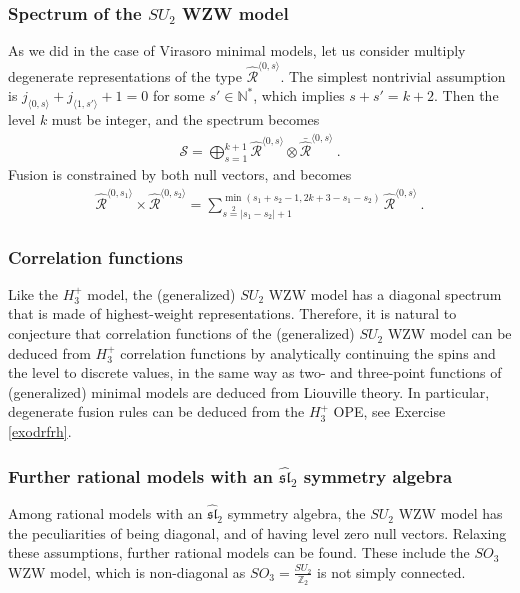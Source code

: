 \documentclass[12pt, a4paper, notitlepage, twoside]{report}
\numberwithin{equation}{section}
\theoremstyle{break}
\begin{document}
\subsubsection{Spectrum of the $SU_2$ WZW model}

As we did in the case of Virasoro minimal models, let us consider multiply degenerate representations of the type $\hat{\mathcal{R}}^{\langle 0, s\rangle}$. 
The simplest nontrivial assumption is $j_{\langle 0, s\rangle} + j_{\langle 1, s'\rangle} +1=0$ for some $s'\in\mathbb{N}^*$, which implies $s+s'=k+2$. 
Then the level $k$ must be integer, and the spectrum becomes 
\begin{align}
 \mathcal{S} = \bigoplus_{s=1}^{k+1} \hat{\mathcal{R}}^{\langle 0, s\rangle}\otimes \bar{\hat{\mathcal{R}}}^{\langle 0, s\rangle}\ .
\end{align}
Fusion is constrained by both null vectors, and becomes 
\begin{align}
 \hat{\mathcal{R}}^{\langle 0, s_1\rangle}\times\hat{\mathcal{R}}^{\langle 0, s_2\rangle} = \sum_{s\overset{2}{=}|s_1-s_2|+1}^{\min(s_1+s_2-1,2k+3-s_1-s_2)} \hat{\mathcal{R}}^{\langle 0, s\rangle}\ .
\end{align}

\subsubsection{Correlation functions}

Like the $H_3^+$ model, the (generalized) $SU_2$ WZW model has a diagonal spectrum that is made of highest-weight representations.
Therefore, it is natural to conjecture that correlation functions of the (generalized) $SU_2$ WZW model can be deduced from $H_3^+$ correlation functions by analytically continuing the spins and the level to discrete values, in the same way as two- and three-point functions of (generalized) minimal models  are deduced from Liouville theory. 
In particular, degenerate fusion rules can be deduced from the $H_3^+$ OPE, see Exercise \ref{exodrfrh}.

\subsubsection{Further rational models with an $\widehat{\mathfrak{sl}}_2$ symmetry algebra}

Among rational models with an $\widehat{\mathfrak{sl}}_2$ symmetry algebra,
the $SU_2$ WZW model has the peculiarities of being diagonal, and of having level zero null vectors. 
Relaxing these assumptions, further rational models can be found.
These include the $SO_3$ WZW model, which is non-diagonal as $SO_3 = \frac{SU_2}{\mathbb{Z}_2}$ is not simply connected.
\end{document}
